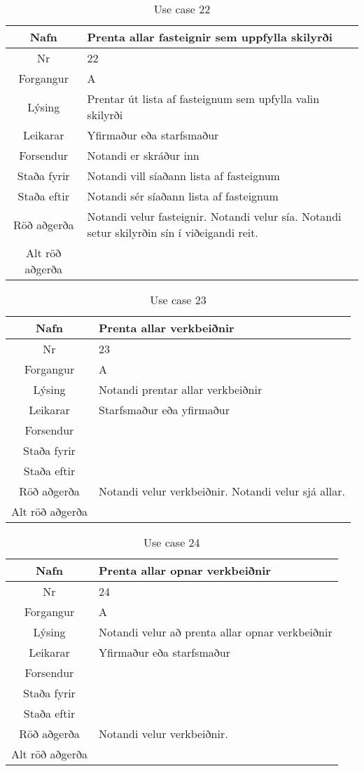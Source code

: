 \begin{table}[h!]\centering
\begin{tabular}{|c|p{10cm}|}
\hline
Nafn&Prenta allar fasteignir sem uppfylla skilyrði\\
\hline
Nr&22\\
\hline
Forgangur&A\\
\hline
Lýsing&Prentar út lista af fasteignum sem upfylla valin skilyrði\\
\hline
Leikarar&Yfirmaður eða starfsmaður\\
\hline
Forsendur&Notandi er skráður inn\\
\hline
Staða fyrir&Notandi vill síaðann lista af fasteignum\\
\hline
Staða eftir&Notandi sér síaðann lista af fasteignum\\
\hline
Röð aðgerða&Notandi velur fasteignir. Notandi velur sía. Notandi setur skilyrðin sín í viðeigandi reit. \\
\hline
Alt röð aðgerða&\\
\hline
\end{tabular}
\caption{Use case 22}\label{tab:use_case_22}
\end{table}
\begin{table}[h!]\centering
\begin{tabular}{|c|p{10cm}|}
\hline
Nafn&Prenta allar verkbeiðnir\\
\hline
Nr&23\\
\hline
Forgangur&A\\
\hline
Lýsing&Notandi prentar allar verkbeiðnir\\
\hline
Leikarar&Starfsmaður eða yfirmaður\\
\hline
Forsendur&\\
\hline
Staða fyrir&\\
\hline
Staða eftir&\\
\hline
Röð aðgerða&Notandi velur verkbeiðnir. Notandi velur sjá allar.\\
\hline
Alt röð aðgerða&\\
\hline
\end{tabular}
\caption{Use case 23}\label{tab:use_case_23}
\end{table}
\begin{table}[h!]\centering
\begin{tabular}{|c|p{10cm}|}
\hline
Nafn&Prenta allar opnar verkbeiðnir\\
\hline
Nr&24\\
\hline
Forgangur&A\\
\hline
Lýsing&Notandi velur að prenta allar opnar verkbeiðnir\\
\hline
Leikarar&Yfirmaður eða starfsmaður\\
\hline
Forsendur&\\
\hline
Staða fyrir&\\
\hline
Staða eftir&\\
\hline
Röð aðgerða&Notandi velur verkbeiðnir.\\
\hline
Alt röð aðgerða&\\
\hline
\end{tabular}
\caption{Use case 24}\label{tab:use_case_24}
\end{table}
